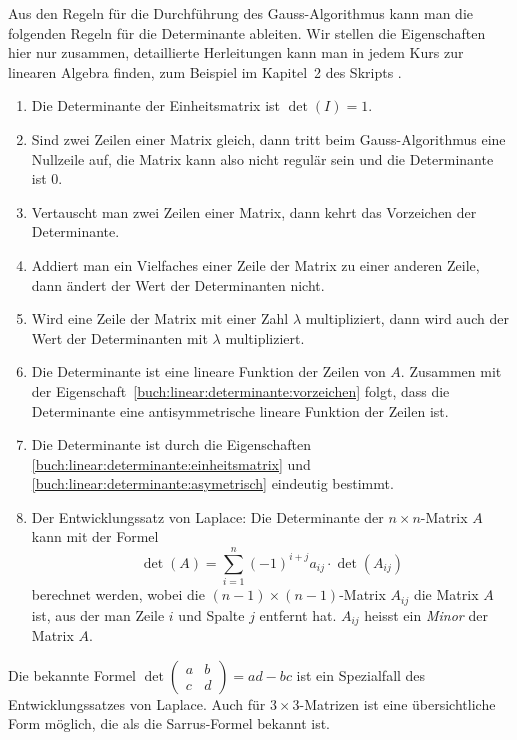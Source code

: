 Aus den Regeln für die Durchführung des Gauss-Algorithmus kann man die
folgenden Regeln für die Determinante ableiten.
Wir stellen die Eigenschaften hier nur zusammen, detaillierte Herleitungen
kann man in jedem Kurs zur linearen Algebra finden, zum Beispiel im
Kapitel~2 des Skripts \cite{buch:linalg}.
\begin{enumerate}
\item
\label{buch:linear:determinante:einheitsmatrix}
Die Determinante der Einheitsmatrix ist $\det(I)=1$.
\item
Sind zwei Zeilen einer Matrix gleich, dann tritt beim Gauss-Algorithmus
eine Nullzeile auf, die Matrix kann also nicht regulär sein und die
Determinante ist $0$.
\item
\label{buch:linear:determinante:vorzeichen}
Vertauscht man zwei Zeilen einer Matrix, dann kehrt das Vorzeichen der
Determinante.
\item
Addiert man ein Vielfaches einer Zeile der Matrix zu einer anderen Zeile,
dann ändert der Wert der Determinanten nicht.
\item
Wird eine Zeile der Matrix mit einer Zahl $\lambda$ multipliziert, dann
wird auch der Wert der Determinanten mit $\lambda$ multipliziert.
\item
\label{buch:linear:determinante:asymetrisch}
Die Determinante ist eine lineare Funktion der Zeilen von $A$.
Zusammen mit der Eigenschaft~\ref{buch:linear:determinante:vorzeichen}
folgt, dass die Determinante eine antisymmetrische lineare Funktion
der Zeilen ist.
\item
Die Determinante ist durch die Eigenschaften
\ref{buch:linear:determinante:einheitsmatrix}
und
\ref{buch:linear:determinante:asymetrisch}
eindeutig bestimmt.
\item
Der Entwicklungssatz von Laplace:
%
Die Determinante der $n\times n$-Matrix $A$ kann mit der Formel
\begin{equation}
\det(A)
=
\sum_{i=1}^n (-1)^{i+j} a_{i\!j} \cdot \det(A_{i\!j})
\end{equation}
berechnet werden,
wobei die $(n-1)\times(n-1)$-Matrix $A_{i\!j}$ die Matrix $A$ ist, aus der
man Zeile $i$ und Spalte $j$ entfernt hat.
$A_{i\!j}$ heisst ein {\em Minor} der Matrix $A$.
\label{buch:linear:def:minor}
%
\end{enumerate}

Die bekannte Formel $\det\begin{pmatrix}a&b\\c&d\end{pmatrix}=ad-bc$
ist ein Spezialfall des Entwicklungssatzes von Laplace.
Auch für $3\times 3$-Matrizen ist eine übersichtliche Form möglich,
die als die Sarrus-Formel bekannt ist.
%

